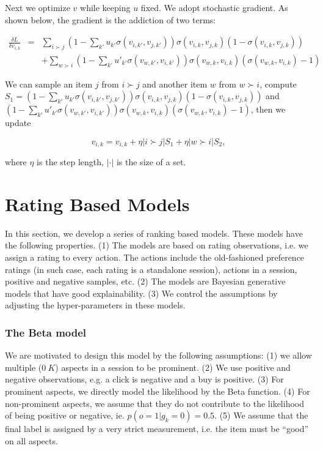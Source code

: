 \documentclass[11pt]{report}
\begin{document}
Next we optimize $v$ while keeping $u$ fixed. We adopt stochastic gradient.  As shown below, the gradient is the addiction of two terms:

\begin{eqnarray*}
\frac{\delta L}{\delta v_{i,k}}&=&\sum_{i\succ j} (1-\sum_{k'} u_{k'}\sigma(v_{i,k'},v_{j,k'}))\sigma(v_{i,k},v_{j,k})(1-\sigma(v_{i,k},v_{j,k}))\\
&&+ \sum_{w\succ i} (1-\sum_{k'} u'_{k'}\sigma(v_{w,k'},v_{i,k'}))\sigma(v_{w,k},v_{i,k})(\sigma(v_{w,k},v_{i,k})-1)
\end{eqnarray*}

We can sample an item $j$ from $i\succ j$ and another item $w$ from $w\succ i$,  compute $S_1= (1-\sum_{k'} u_{k'}\sigma(v_{i,k'},v_{j,k'}))\sigma(v_{i,k},v_{j,k})(1-\sigma(v_{i,k},v_{j,k}))$ and $(1-\sum_{k'} u'_{k'}\sigma(v_{w,k'},v_{i,k'}))\sigma(v_{w,k},v_{i,k})(\sigma(v_{w,k},v_{i,k})-1)$, then we update 

\begin{equation}
v_{i,k}=v_{i,k}+\eta |i\succ j| S_1 +\eta |w\succ i| S_2,
\end{equation}

where $\eta$ is the step length, $|\cdot|$ is the size of a set.
 
\part{Rating Based Models}
In this section, we develop a series of ranking based models. These models have the following properties. (1) The models are based on rating observations, i.e. we assign a rating to every action. The actions include the old-fashioned preference ratings (in such case, each rating is a standalone session), actions in a session, positive and negative samples, etc. (2) The models are Bayesian generative models that have good explainability. (3) We control the assumptions by adjusting the hyper-parameters in these models.
   
\section{The Beta model}
 We are motivated to design this model by the following assumptions: (1) we allow  multiple ($0~K$) aspects in a session to be prominent. (2) We use positive and negative observations, e.g. a click is negative and a buy is positive. (3) For prominent aspects, we directly model the likelihood by the Beta function. (4) For non-prominent aspects, we assume that they do not contribute to the likelihood of being positive or negative, ie. $p(o=1|g_k=0)=0.5$.  (5) We assume that the final label is assigned by a very strict measurement, i.e. the item must be ``good'' on all aspects.
 
\end{document}
